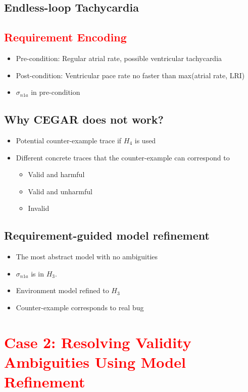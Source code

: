 \documentclass{llncs}
\begin{document}
\subsection{Endless-loop Tachycardia}
\subsection{\textcolor{red}{Requirement Encoding}}
\begin{itemize}
	\item Pre-condition: Regular atrial rate, possible ventricular tachycardia
    \item Post-condition: Ventricular pace rate no faster than max(atrial rate, LRI)
    \item $\sigma_{n1a}$ in pre-condition
\end{itemize}
\subsection{Why CEGAR does not work?}
\begin{itemize}
	\item Potential counter-example trace if $H_4$ is used
    \item Different concrete traces that the counter-example can correspond to
    
    \begin{itemize}
    	\item Valid and harmful
        \item Valid and unharmful
        \item Invalid
    \end{itemize}
\end{itemize}
\subsection{Requirement-guided model refinement}
\begin{itemize}
	\item The most abstract model with no ambiguities
    \item $\sigma_{n1a}$ is in $H_3$.
    \item Environment model refined to $H_3$
    \item Counter-example corresponds to real bug
\end{itemize}

\section{\textcolor{red}{Case 2: Resolving Validity Ambiguities Using Model Refinement}}
\end{document}
